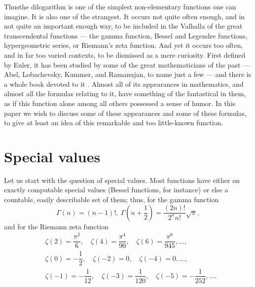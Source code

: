Thus\pageoriginale the dilogarithm is one of the simplest non-elementary functions one can imagine. It is also one of the strangest. It occurs not quite often enough, and in not quite an important enough way, to be included in the Valhalla of the great transcendental functions --- the gamma function, Bessel and Legendre functions, hypergeometric series, or Riemann's zeta function. And yet it occurs too often, and in far too varied contexts, to be dismissed as a mere curiosity. First defined by Euler, it has been studied by some of the great mathematicians of the past --- Abel, Lobachevsky, Kummer, and Ramanujan, to name just a few --- and there is a whole book devoted to it \cite{art15-key4}. Almost all of its appearances in mathematics, and almost all the formulas relating to it, have something of the fantastical in them, as if this function alone among all others possessed a sense of humor. In this paper we wish to discuss some of these appearances and some of these formulas, to give at least an idea of this remarkable and too little-known function.

\section{Special values}\label{art15-sec1}
Let us start with the question of special values. Most functions have either on exactly computable special values (Bessel functions, for instance) or else a countable, easily describable set of them; thus, for the gamma function
$$
\Gamma(n)=(n-1)!, \ \Gamma\left(n+\dfrac{1}{2}\right)=\dfrac{(2n)!}{2^{n}n!}\sqrt{\pi},
$$
and for the Riemann zeta function
\begin{align*}
& \zeta(2) =\dfrac{\pi^{2}}{6},\quad \zeta(4)=\dfrac{\pi^{4}}{90},\quad \zeta(6)=\dfrac{\pi^{6}}{945},\ldots,\\
& \zeta(0)=-\dfrac{1}{2},\quad \zeta(-2)=0,\quad \zeta(-4)=0,\ldots,\\
& \zeta(-1)=-\dfrac{1}{12},\quad \zeta(-3)=\dfrac{1}{120},\quad \zeta(-5)=-\dfrac{1}{252},\ldots.
\end{align*}

